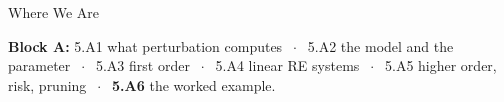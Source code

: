 

\graphicspath{{./figures/}}





\makedecktitle

\begin{frame}{Where We Are}
\vspace{-1mm}
\begin{center}
\small \textbf{Block A:} 5.A1 what perturbation computes $\;\cdot\;$ 5.A2 the model and the parameter $\;\cdot\;$ 5.A3 first order $\;\cdot\;$ 5.A4 linear RE systems $\;\cdot\;$ 5.A5 higher order, risk, pruning $\;\cdot\;$ \textbf{5.A6} the worked example.
\end{center}
\end{frame}

